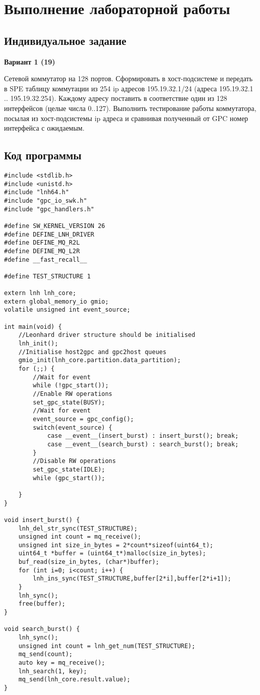 \chapter{Выполнение лабораторной работы}

\section{Индивидуальное задание}

\textbf{Вариант 1 (19)}

Сетевой коммутатор на 128 портов. Сформировать в хост-подсистеме и передать в SPE таблицу коммутации из 254 ip адресов 195.19.32.1/24 (адреса 195.19.32.1 .. 195.19.32.254). Каждому адресу поставить в соответствие один из 128 интерфейсов (целые числа 0..127). Выполнить тестирование работы коммутатора, посылая из хост-подсистемы ip адреса и сравнивая полученный от GPC номер интерфейса с ожидаемым.




\section{Код программы}

\captionsetup{singlelinecheck = false, justification=raggedright}
\begin{lstlisting}[label=full, caption=sw\_kernel\_main.c]
#include <stdlib.h>
#include <unistd.h>
#include "lnh64.h"
#include "gpc_io_swk.h"
#include "gpc_handlers.h"

#define SW_KERNEL_VERSION 26
#define DEFINE_LNH_DRIVER
#define DEFINE_MQ_R2L
#define DEFINE_MQ_L2R
#define __fast_recall__

#define TEST_STRUCTURE 1

extern lnh lnh_core;
extern global_memory_io gmio;
volatile unsigned int event_source;

int main(void) {
	//Leonhard driver structure should be initialised
	lnh_init();
	//Initialise host2gpc and gpc2host queues
	gmio_init(lnh_core.partition.data_partition);
	for (;;) {
		//Wait for event
		while (!gpc_start());
		//Enable RW operations
		set_gpc_state(BUSY);
		//Wait for event
		event_source = gpc_config();
		switch(event_source) {
			case __event__(insert_burst) : insert_burst(); break;
			case __event__(search_burst) : search_burst(); break;
		}
		//Disable RW operations
		set_gpc_state(IDLE);
		while (gpc_start());
		
	}
}

void insert_burst() {
	lnh_del_str_sync(TEST_STRUCTURE);
	unsigned int count = mq_receive();
	unsigned int size_in_bytes = 2*count*sizeof(uint64_t);
	uint64_t *buffer = (uint64_t*)malloc(size_in_bytes);
	buf_read(size_in_bytes, (char*)buffer);
	for (int i=0; i<count; i++) {
		lnh_ins_sync(TEST_STRUCTURE,buffer[2*i],buffer[2*i+1]);
	}
	lnh_sync();
	free(buffer);
}

void search_burst() {
	lnh_sync(); 
	unsigned int count = lnh_get_num(TEST_STRUCTURE);
	mq_send(count);
	auto key = mq_receive();
	lnh_search(1, key);
	mq_send(lnh_core.result.value);
}
\end{lstlisting}

